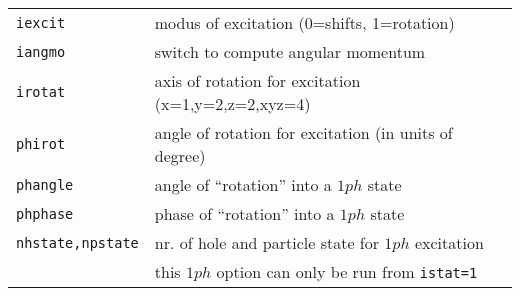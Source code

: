 \documentclass[12pt]{article}
\begin{document}
\begin{tabular}{ll}
{\tt iexcit} & modus of excitation (0=shifts, 1=rotation)\\
{\tt iangmo} & switch to compute angular momentum\\
{\tt irotat} & axis of rotation for excitation (x=1,y=2,z=2,xyz=4)\\
{\tt phirot} & angle of rotation for excitation (in units of degree)\\
{\tt phangle}        & angle of ``rotation'' into a $1ph$ state\\
{\tt phphase}        & phase of ``rotation'' into a $1ph$ state\\
{\tt nhstate,npstate}& nr. of hole and particle state for $1ph$
                      excitation\\
                     & this $1ph$ option can only be run from {\tt istat=1}
\\
\hline
\end{tabular}
\end{document}
